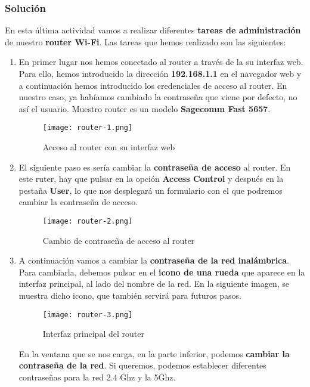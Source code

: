 \subsubsection{Solución}
En esta última actividad vamos a realizar diferentes \textbf{tareas de administración} de nuestro \textbf{router Wi-Fi}. Las tareas que hemos realizado son las siguientes:

\begin{enumerate}
    \item En primer lugar nos hemos conectado al router a través de la su interfaz web. Para ello, hemos introducido la dirección \textbf{192.168.1.1} en el navegador web y a continuación hemos introducido los credenciales de acceso al router. En nuestro caso, ya habíamos cambiado la contraseña que viene por defecto, no así el usuario. Muestro router es un  modelo \textbf{Sagecomm Fast 5657}.

   \begin{figure}[H]
        \centering
        \texttt{[image: router-1.png]}
        \caption{Acceso al router con su interfaz web}
    \end{figure}

    \item El siguiente paso es sería cambiar la \textbf{contraseña de acceso} al router. En este ruter, hay que pulsar en la opción \textbf{Access Control} y después en la pestaña \textbf{User}, lo que nos desplegará un formulario con el que podremos cambiar la contraseña de acceso.

    \begin{figure}[H]
        \centering
        \texttt{[image: router-2.png]}
        \caption{Cambio de contraseña de acceso al router}
    \end{figure}

    \item A continuación vamos a cambiar la \textbf{contraseña de la red inalámbrica}. Para cambiarla, debemos pulsar en el \textbf{icono de una rueda} que aparece en la interfaz principal, al lado del nombre de la red. En la siguiente imagen, se muestra dicho icono, que también servirá para futuros pasos.

    \begin{figure}[H]
        \centering
        \texttt{[image: router-3.png]}
        \caption{Interfaz principal del router}
    \end{figure}

    En la ventana que se nos carga, en la parte inferior, podemos \textbf{cambiar la contraseña de la red}. Si queremos, podemos establecer diferentes contraseñas para la red 2.4 Ghz y la 5Ghz.


\end{enumerate}
